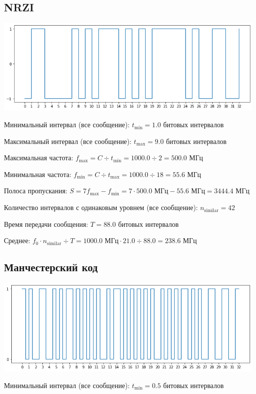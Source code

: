 \subsection{NRZI}
\includegraphics[width=\textwidth]{1nrzi}

Минимальный интервал (все сообщение): $t_\mathrm{min}=1.0$ битовых интервалов

Максимальный интервал (все сообщение): $t_\mathrm{max}=9.0$ битовых интервалов

Максимальная частота: $f_\mathrm{max}=C\div t_\mathrm{min}=1000.0\div 2=500.0$ МГц

Минимальная частота: $f_\mathrm{min}=C\div t_\mathrm{max}=1000.0\div 18=55.6$ МГц

Полоса пропускания: $S=7f_\mathrm{max}-f_\mathrm{min} = 7\cdot 500.0\text{ МГц}-55.6\text{ МГц}=3444.4$ МГц

Количество интервалов с одинаковым уровнем (все сообщение): $n_\mathrm{similar}=42$

Время передачи сообщения: $T=88.0$ битовых интервалов

Среднее: $f_0\cdot n_\mathrm{similar}\div T=1000.0\text{ МГц}\cdot 21.0\div 88.0=238.6$ МГц

\subsection{Манчестерский код}
\includegraphics[width=\textwidth]{1manchester}

Минимальный интервал (все сообщение): $t_\mathrm{min}=0.5$ битовых интервалов

